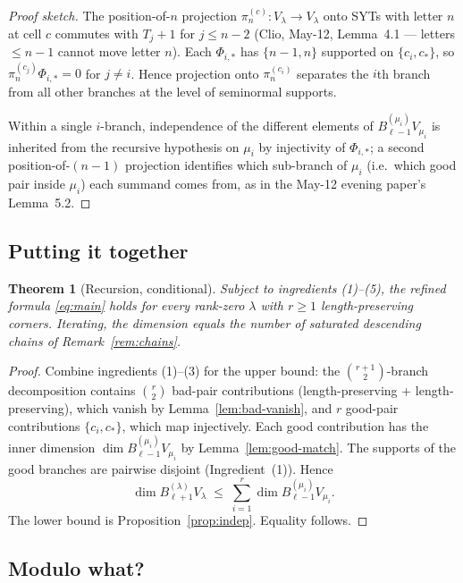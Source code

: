 \documentclass[11pt]{article}
\newtheorem{theorem}{Theorem}
\theoremstyle{definition}
\begin{document}
\begin{proof}[Proof sketch]
The position-of-$n$ projection $\pi_n^{(c)}: V_\lambda \to V_\lambda$
onto SYTs with letter $n$ at cell $c$ commutes with $T_j{+}1$ for
$j \le n - 2$ (Clio, May-12, Lemma~4.1 — letters $\le n - 1$ cannot
move letter $n$). Each $\Phi_{i, *}$ has $\{n - 1, n\}$ supported on
$\{c_i, c_*\}$, so $\pi_n^{(c_j)} \Phi_{i, *} = 0$ for $j \ne i$. Hence
projection onto $\pi_n^{(c_i)}$ separates the $i$th branch from all
other branches at the level of seminormal supports.

Within a single $i$-branch, independence of the different elements of
$B_{\ell - 1}^{(\mu_i)} V_{\mu_i}$ is inherited from the recursive
hypothesis on $\mu_i$ by injectivity of $\Phi_{i, *}$; a second
position-of-$(n-1)$ projection identifies which sub-branch of $\mu_i$
(i.e.\ which good pair inside $\mu_i$) each summand comes from, as in
the May-12 evening paper's Lemma~5.2.
\end{proof}

\subsection{Putting it together}

\begin{theorem}[Recursion, conditional]\label{thm:main}
Subject to ingredients (1)--(5), the refined formula
\eqref{eq:main} holds for every rank-zero $\lambda$ with
$r \ge 1$ length-preserving corners. Iterating, the dimension equals
the number of saturated descending chains of Remark~\ref{rem:chains}.
\end{theorem}

\begin{proof}[Proof]
Combine ingredients (1)--(3) for the upper bound: the
$\binom{r+1}{2}$-branch decomposition contains $\binom{r}{2}$ bad-pair
contributions (length-preserving + length-preserving), which vanish by
Lemma~\ref{lem:bad-vanish}, and $r$ good-pair contributions
$\{c_i, c_*\}$, which map injectively. Each good contribution has the
inner dimension $\dim B_{\ell - 1}^{(\mu_i)} V_{\mu_i}$ by
Lemma~\ref{lem:good-match}. The supports of the good branches are
pairwise disjoint (Ingredient~(1)). Hence
\[
   \dim B_{\ell + 1}^{(\lambda)} V_\lambda
   \;\le\;
   \sum_{i = 1}^{r}
   \dim B_{\ell - 1}^{(\mu_i)} V_{\mu_i}.
\]
The lower bound is Proposition~\ref{prop:indep}. Equality follows.
\end{proof}

\subsection{Modulo what?}
\end{document}
